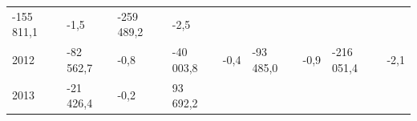 \begin{longtable}[]{@{}lllllllll@{}}
\begin{minipage}[t]{0.12\columnwidth}
-155 811,1\strut
\end{minipage} & \begin{minipage}[t]{0.06\columnwidth}\raggedright
-1,5\strut
\end{minipage} & \begin{minipage}[t]{0.09\columnwidth}\raggedright
-259 489,2\strut
\end{minipage} & \begin{minipage}[t]{0.06\columnwidth}\raggedright
-2,5\strut
\end{minipage}\tabularnewline
\begin{minipage}[t]{0.05\columnwidth}\raggedright
2012\strut
\end{minipage} & \begin{minipage}[t]{0.10\columnwidth}\raggedright
-82 562,7\strut
\end{minipage} & \begin{minipage}[t]{0.06\columnwidth}\raggedright
-0,8\strut
\end{minipage} & \begin{minipage}[t]{0.16\columnwidth}\raggedright
-40 003,8\strut
\end{minipage} & \begin{minipage}[t]{0.06\columnwidth}\raggedright
-0,4\strut
\end{minipage} & \begin{minipage}[t]{0.12\columnwidth}\raggedright
-93 485,0\strut
\end{minipage} & \begin{minipage}[t]{0.06\columnwidth}\raggedright
-0,9\strut
\end{minipage} & \begin{minipage}[t]{0.09\columnwidth}\raggedright
-216 051,4\strut
\end{minipage} & \begin{minipage}[t]{0.06\columnwidth}\raggedright
-2,1\strut
\end{minipage}\tabularnewline
\begin{minipage}[t]{0.05\columnwidth}\raggedright
2013\strut
\end{minipage} & \begin{minipage}[t]{0.10\columnwidth}\raggedright
-21 426,4\strut
\end{minipage} & \begin{minipage}[t]{0.06\columnwidth}\raggedright
-0,2\strut
\end{minipage} & \begin{minipage}[t]{0.16\columnwidth}\raggedright
93 692,2\strut

\end{minipage}
\end{longtable}
